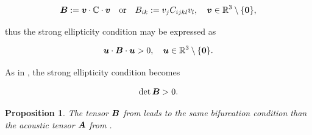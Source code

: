 \documentclass[12pt]{article}
\newtheorem{proposition}{Proposition}
\numberwithin{equation}{section}
\begin{document}
\begin{equation} \label{eq:Cartesian-acoustic-tensor}
  {\boldsymbol{B}} := {\boldsymbol{v}} \cdot \mathbb{C} \cdot {\boldsymbol{v}}
  \quad \text{or} \quad
  B_{ik} := v_j C_{ijkl} v_l,
  \quad
  {\boldsymbol{v}} \in \mathbb{R}^3 \setminus \{\mathbf{0}\},
\end{equation}

thus the strong ellipticity condition may be expressed as

\begin{equation} \label{eq:Cartesian-acoustic-ellipticity}
  {\boldsymbol{u}} \cdot {\boldsymbol{B}} \cdot {\boldsymbol{u}} > 0,
  \quad
  {\boldsymbol{u}} \in \mathbb{R}^3 \setminus \{\mathbf{0}\}.
\end{equation}

As in , the strong ellipticity
condition becomes

\begin{equation} \label{Cartesian-acoustic-determinant}
  \det {\boldsymbol{B}} > 0.
\end{equation}

\begin{proposition}
  The tensor ${\boldsymbol{B}}$ from  leads to
  the same bifurcation condition than the acoustic tensor ${\boldsymbol{A}}$ from
  .
\end{proposition}
\end{document}
